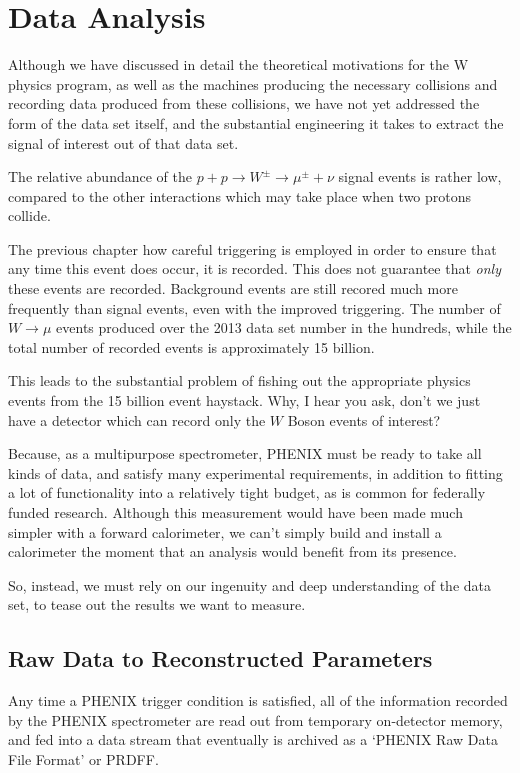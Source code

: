 \chapter{Data Analysis}
\label{ch:data_analysis}
Although we have discussed in detail the theoretical motivations for the W
physics program, as well as the machines producing the necessary collisions and
recording data produced from these collisions, we have not yet addressed the
form of the data set itself, and the substantial engineering it takes to extract
the signal of interest out of that data set.

The relative abundance of the $p + p \rightarrow W^\pm \rightarrow \mu^\pm +
\nu$ signal events is rather low, compared to the other interactions which may
take place when two protons collide. 

The previous chapter how careful triggering is employed in order to ensure that
any time this event does occur, it is recorded. This does not guarantee that
\textit{only} these events are recorded. Background events are still recored
much more frequently than signal events, even with the improved triggering. The
number of $W\rightarrow\mu$ events produced over the 2013 data set number in the
hundreds, while the total number of recorded events is approximately 15 billion.

This leads to the substantial problem of fishing out the appropriate physics
events from the 15 billion event haystack. Why, I hear you ask, don't we just
have a detector which can record only the $W$ Boson events of interest?

Because, as a multipurpose spectrometer, PHENIX must be ready to take
all kinds of data, and satisfy many experimental requirements, in addition to
fitting a lot of functionality into a relatively tight budget, as is common for
federally funded research. Although this measurement would have been made
much simpler with a forward calorimeter, we can't simply build and install a
calorimeter the moment that an analysis would benefit from its presence.

So, instead, we must rely on our ingenuity and deep understanding of the data
set, to tease out the results we want to measure.

\section{Raw Data to Reconstructed Parameters}

Any time a PHENIX trigger condition is satisfied, all of the information
recorded by the PHENIX spectrometer are read out from temporary on-detector
memory, and fed into a data stream that eventually is archived as a `PHENIX Raw
Data File Format' or PRDFF. 

